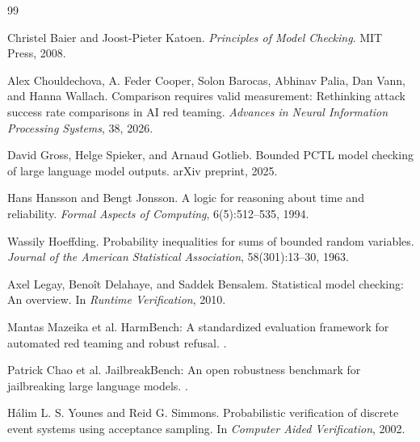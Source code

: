 \documentclass[11pt]{article}
\begin{document}
\begin{thebibliography}{99}

Christel Baier and Joost-Pieter Katoen.
\newblock \emph{Principles of Model Checking}.
\newblock MIT Press, 2008.

Alex Chouldechova, A. Feder Cooper, Solon Barocas, Abhinav Palia, Dan Vann, and Hanna Wallach.
\newblock Comparison requires valid measurement: Rethinking attack success rate comparisons in AI red teaming.
\newblock \emph{Advances in Neural Information Processing Systems}, 38, 2026.

David Gross, Helge Spieker, and Arnaud Gotlieb.
\newblock Bounded PCTL model checking of large language model outputs.
\newblock arXiv preprint, 2025.

Hans Hansson and Bengt Jonsson.
\newblock A logic for reasoning about time and reliability.
\newblock \emph{Formal Aspects of Computing}, 6(5):512--535, 1994.

Wassily Hoeffding.
\newblock Probability inequalities for sums of bounded random variables.
\newblock \emph{Journal of the American Statistical Association}, 58(301):13--30, 1963.

Axel Legay, Beno\^{i}t Delahaye, and Saddek Bensalem.
\newblock Statistical model checking: An overview.
\newblock In \emph{Runtime Verification}, 2010.

Mantas Mazeika et al.
\newblock HarmBench: A standardized evaluation framework for automated red teaming and robust refusal.
.

Patrick Chao et al.
\newblock JailbreakBench: An open robustness benchmark for jailbreaking large language models.
.

H{\'a}lim L. S. Younes and Reid G. Simmons.
\newblock Probabilistic verification of discrete event systems using acceptance sampling.
\newblock In \emph{Computer Aided Verification}, 2002.

\end{thebibliography}
\end{document}

